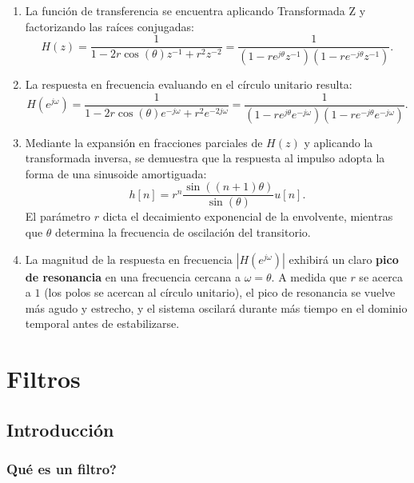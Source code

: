 \documentclass[11pt,a4paper,openany]{book}
\begin{document}
\begin{enumerate}
	\item La funci\'{o}n de transferencia se encuentra aplicando Transformada Z y factorizando las raíces conjugadas:
	\begin{equation}
		H(z) = \frac{1}{1 - 2r\cos(\theta) z^{-1} + r^{2} z^{-2}} = \frac{1}{(1 - r e^{j\theta} z^{-1})(1 - r e^{-j\theta} z^{-1})}.
	\end{equation}
	
	\item La respuesta en frecuencia evaluando en el círculo unitario resulta:
	\begin{equation}
		H(e^{j\omega}) = \frac{1}{1 - 2r\cos(\theta) e^{-j\omega} + r^{2} e^{-2j\omega}} = \frac{1}{(1 - r e^{j\theta} e^{-j\omega})(1 - r e^{-j\theta} e^{-j\omega})}.
	\end{equation}
	
	\item Mediante la expansión en fracciones parciales de $H(z)$ y aplicando la transformada inversa, se demuestra que la respuesta al impulso adopta la forma de una sinusoide amortiguada:
	\begin{equation}
		h[n] = r^{n} \frac{\sin((n+1)\theta)}{\sin(\theta)} u[n].
	\end{equation}
	El parámetro $r$ dicta el decaimiento exponencial de la envolvente, mientras que $\theta$ determina la frecuencia de oscilación del transitorio.
	
	\item La magnitud de la respuesta en frecuencia $|H(e^{j\omega})|$ exhibirá un claro \textbf{pico de resonancia} en una frecuencia cercana a $\omega = \theta$. A medida que $r$ se acerca a $1$ (los polos se acercan al círculo unitario), el pico de resonancia se vuelve más agudo y estrecho, y el sistema oscilará durante más tiempo en el dominio temporal antes de estabilizarse.
\end{enumerate}


\chapter{Filtros}

\section{Introducci\'{o}n}

\subsection{\textquestiondown Qu\'{e} es un filtro?}
\end{document}
